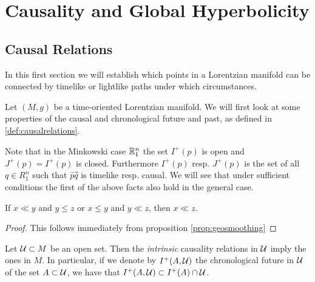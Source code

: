 \chapter{Causality and Global Hyperbolicity}\label{chap:causality}
\section{Causal Relations}
In this first section we will establish which points in a Lorentzian manifold can be connected by timelike or lightlike paths under which circumstances. 

Let $(M,g)$ be a time-oriented Lorentzian manifold. We will first look at some properties of the causal and chronological future and past, as defined in \ref{def:causalrelations}.

Note that in the Minkowski case $\mathbb{R}^n_1$ the set $I^+(p)$ is open and $J^+(p)=\overline{I^+(p)}$ is closed. Furthermore $I^+(p)$ resp. $J^+(p)$ is the set of all $q\in R^n_1$ such that $\overrightarrow{pq}$ is timelike resp. causal.
We will see that under sufficient conditions the first of the above facts also hold in the general case.

\begin{corollary}
If $x\ll y$ and $y\leq z$ or $x\leq y$ and $y\ll z$, then $x\ll z$.
\end{corollary}
\begin{proof}
This follows immediately from proposition \ref{prop:geosmoothing}
\end{proof}

Let $\mathcal{U} \subset M$ be an open set. Then the \emph{intrinsic} causality relations in $\mathcal{U}$ imply the ones in $M$. In particular, if we denote by $I^+(A,\mathcal{U})$ the chronological future in $\mathcal{U}$ of the set $A\subset\mathcal{U}$, we have that $I^+(A,\mathcal{U}) \subset I^+(A)\cap \mathcal{U}$.

